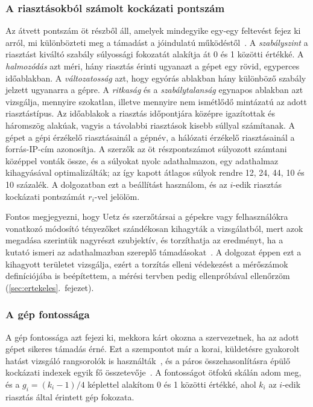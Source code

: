 \subsubsection{A riasztásokból számolt kockázati pontszám}
Az átvett pontszám öt részből áll, amelyek mindegyike egy-egy feltevést fejez ki arról, mi különbözteti meg a támadást a jóindulatú működéstől~\cite{uetz2026rba}. A \emph{szabályszint} a riasztást kiváltó szabály súlyossági fokozatát alakítja át 0 és 1 közötti értékké. A \emph{halmozódás} azt méri, hány riasztás érinti ugyanazt a gépet egy rövid, egyperces időablakban. A \emph{változatosság} azt, hogy egyórás ablakban hány különböző szabály jelzett ugyanarra a gépre. A \emph{ritkaság} és a \emph{szabálytalanság} egynapos ablakban azt vizsgálja, mennyire szokatlan, illetve mennyire nem ismétlődő mintázatú az adott riasztástípus. Az időablakok a riasztás időpontjára középre igazítottak és háromszög alakúak, vagyis a távolabbi riasztások kisebb súllyal számítanak. A gépet a gépi érzékelő riasztásainál a gépnév, a hálózati érzékelő riasztásainál a forrás-IP-cím azonosítja. A szerzők az öt részpontszámot súlyozott számtani középpel vonták össze, és a súlyokat nyolc adathalmazon, egy adathalmaz kihagyásával optimalizálták; az így kapott átlagos súlyok rendre 12, 24, 44, 10 és 10 százalék. A dolgozatban ezt a beállítást használom, és az $i$-edik riasztás kockázati pontszámát $r_i$-vel jelölöm.

Fontos megjegyezni, hogy Uetz és szerzőtársai a gépekre vagy felhasználókra vonatkozó módosító tényezőket szándékosan kihagyták a vizsgálatból, mert azok megadása szerintük nagyrészt szubjektív, és torzíthatja az eredményt, ha a kutató ismeri az adathalmazban szereplő támadásokat~\cite{uetz2026rba}. A dolgozat éppen ezt a kihagyott területet vizsgálja, ezért a torzítás elleni védekezést a mérőszámok definíciójába is beépítettem, a mérési tervben pedig ellenpróbával ellenőrzöm (\ref{sec:ertekeles}.~fejezet).

\subsubsection{A gép fontossága}
A gép fontossága azt fejezi ki, mekkora kárt okozna a szervezetnek, ha az adott gépet sikeres támadás érné. Ezt a szempontot már a korai, küldetésre gyakorolt hatást vizsgáló rangsorolók is használták~\cite{porras2002}, és a páros összehasonlításra épülő kockázati indexek egyik fő összetevője~\cite{anuar2012}. A fontosságot ötfokú skálán adom meg, és a $g_i = (k_i - 1)/4$ képlettel alakítom 0 és 1 közötti értékké, ahol $k_i$ az $i$-edik riasztás által érintett gép fokozata.

